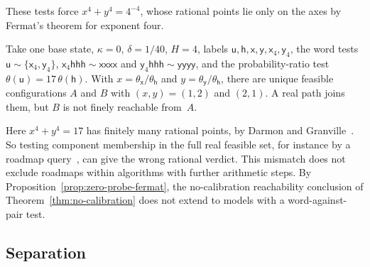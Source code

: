 These tests force $x^4+y^4=4^{-4}$, whose rational points lie only on the
axes by Fermat's theorem for exponent four.

\begin{proposition}\label{prop:zero-probe-fermat}
Take one base state, $\kappa=0$, $\delta=1/40$, $H=4$, labels
$\mathsf u,\mathsf h,\mathsf x,\mathsf y,\mathsf x_4,\mathsf y_4$, the
word tests $\mathsf u\sim\{\mathsf x_4,\mathsf y_4\}$,
$\mathsf x_4\mathsf{hhh}\sim\mathsf{xxxx}$ and
$\mathsf y_4\mathsf{hhh}\sim\mathsf{yyyy}$, and the probability-ratio test
$\theta(\mathsf u)=17\,\theta(\mathsf h)$. With
$x=\theta_{\mathsf x}/\theta_{\mathsf h}$ and
$y=\theta_{\mathsf y}/\theta_{\mathsf h}$, there are unique feasible
configurations $A$ and $B$ with $(x,y)=(1,2)$ and $(2,1)$. A real path
joins them, but $B$ is not finely
reachable from~$A$.
\end{proposition}

Here $x^4+y^4=17$ has finitely many rational points, by Darmon and
Granville~\cite[Theorem~2]{darmongranville}. So testing component membership in the full real feasible set, for
instance by a roadmap query~\cite{canny93,basupollackroy2006book}, can give
the wrong rational verdict. This mismatch does not exclude roadmaps within
algorithms with further arithmetic steps.
By Proposition~\ref{prop:zero-probe-fermat}, the no-calibration
reachability conclusion of Theorem~\ref{thm:no-calibration} does not
extend to models with a word-against-pair test.

\subsection{Separation}\label{sec:separation}

